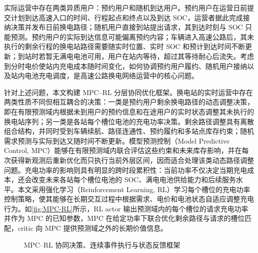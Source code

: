 \documentclass[12pt,a4paper,UTF8]{ctexart}
\begin{document}
实际运营中存在两类异质用户：预约用户和随机到达用户。预约用户在运营日前提交计划到达高速入口的时间、行程起点和终点以及到达 SOC，运营者据此完成接纳决策并发布日前换电路径；随机用户直接到站提出请求，其到达时刻与 SOC 只能预测。预约用户的实际到达信息可能偏离预约内容；车辆进入高速公路后，其未执行的剩余行程的换电站路径需要随实时位置、实时 SOC 和预计到达时间不断更新；到站时若暂无满电电池可用，用户在站内等待，超过其等待耐心后流失。考虑到分时电价使站内充电成本随时间变化，如何协调预约用户履约、随机用户接纳以及站内电池充电调度，是高速公路换电网络运营中的核心问题。

针对上述问题，本文构建 MPC--RL 分层协同优化框架。换电站的实时运营中存在两类性质不同但相互耦合的决策：一类是预约用户剩余换电路径的动态调整决策，即在有限预测域内根据未到用户的预约信息和在途用户的实时状态调整其未执行的换电站序列；另一类是各站每个槽位电池的充电功率决策。剩余路径调整具有离散组合结构，并同时受到车辆续航、路径连通性、预约履约和多站点库存约束；随机需求预测与实际到达又随时间不断更新。模型预测控制（Model Predictive Control, MPC）能够在有限预测域内联合评估这些约束和未来库存影响，并在每次获得新观测后重新优化而只执行当前外层区间，因而适合处理该类动态路径调整问题。充电功率的影响则具有明显的跨时段累积性：当前功率不仅决定当期充电成本，还会改变未来各站每个槽位电池的 SOC、满电电池供给能力和后续服务水平。本文采用强化学习（Reinforcement Learning, RL）学习每个槽位的充电功率控制策略，使其能够在长期交互过程中根据需求、电价和电池状态自适应调整充电行为。如\autoref{fig:MPC-RL}所示，RL actor 输出预测域内的每个槽位的请求充电功率并作为 MPC 的已知参数，MPC 在给定功率下联合优化剩余路径与请求的槽位匹配，critic 向 MPC 提供预测域之外的长期价值信息。

\begin{figure}[!htbp]
  \centering
  \caption{MPC--RL 协同决策、连续事件执行与状态反馈框架}
  \label{fig:MPC-RL}
\end{figure}
\end{document}
